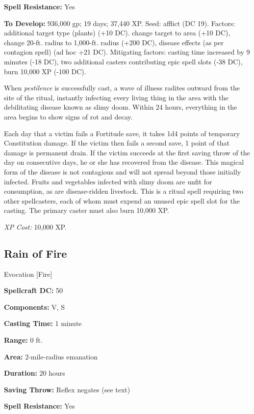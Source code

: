 \documentclass{article}
\begin{document}
\textbf{Spell Resistance:} Yes 

\textbf{To Develop:} 936,000 gp; 19 days; 37,440 XP. Seed: afflict (DC 19). Factors: 
additional target type (plants) (+10 DC). change target to area (+10 DC), change 
20-ft. radius to 1,000-ft. radius (+200 DC), disease effects (as per contagion 
spell) (ad hoc +21 DC). Mitigating factors: casting time increased by 9 minutes 
(-18 DC), two additional casters contributing epic spell slots (-38 DC), burn 10,000 
XP (-100 DC).

When \textit{pestilence }is successfully cast, a wave of illness radites outward 
from the site of the ritual, instantly infecting every living thing in the area 
with the debilitating disease known as slimy doom. Within 24 hours, everything 
in the area begins to show signs of rot and decay.

Each day that a victim fails a Fortitude save, it takes 1d4 points of temporary 
Constitution damage. If the victim then fails a second save, 1 point of that damage 
is permanent drain. If the victim succeeds at the first saving throw of the day 
on consecutive days, he or she has recovered from the disease. This magical form 
of the disease is not contagious and will not spread beyond those initially infected. 
Fruits and vegetables infected with slimy doom are unfit for consumption, as are 
disease-ridden livestock. This is a ritual spell requiring two other spellcasters, 
each of whom must expend an unused epic spell slot for the casting. The primary 
caster must also burn 10,000 XP. 

\textit{XP Cost: }10,000 XP. 

\vspace{12pt}
\subsection*{Rain of Fire }

Evocation [Fire] 

\textbf{Spellcraft DC:} 50 

\textbf{Components:} V, S 

\textbf{Casting Time:} 1 minute 

\textbf{Range:} 0 ft. 

\textbf{Area:} 2-mile-radius emanation 

\textbf{Duration:} 20 hours 

\textbf{Saving Throw:} Reflex negates (see text) 

\textbf{Spell Resistance:} Yes 
\end{document}
